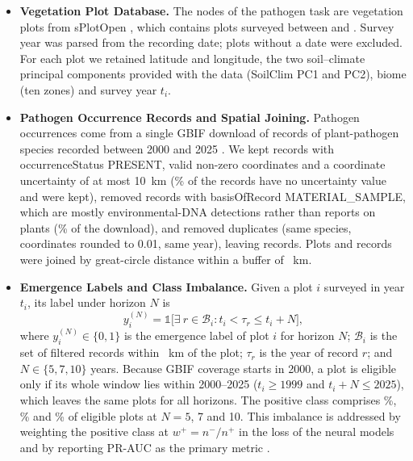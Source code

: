 \documentclass[a4paper,fleqn]{cas-sc}
\begin{document}
\begin{itemize}[leftmargin=1.4em]

\item \textbf{Vegetation Plot Database.} The nodes of the pathogen task are vegetation plots from sPlotOpen \citep{sabatini2021,splotdata}, which contains \nPlotsTotal{} plots surveyed between \surveyYearMin{} and \surveyYearMax. Survey year was parsed from the recording date; \nPlotsNoDate{} plots without a date were excluded. For each plot we retained latitude and longitude, the two soil--climate principal components provided with the data (SoilClim PC1 and PC2), biome (ten zones) and survey year $t_i$.

\item \textbf{Pathogen Occurrence Records and Spatial Joining.} Pathogen occurrences come from a single GBIF download of \gbifRecordsRaw{} records of \gbifSpecies{} plant-pathogen species recorded between 2000 and 2025 \citep{gbifdownload}. We kept records with occurrenceStatus PRESENT, valid non-zero coordinates and a coordinate uncertainty of at most 10~km (\pctUncMissing\% of the records have no uncertainty value and were kept), removed records with basisOfRecord MATERIAL\_SAMPLE, which are mostly environmental-DNA detections rather than reports on plants (\pctMaterialSample\% of the download), and removed duplicates (same species, coordinates rounded to 0.01\textdegree, same year), leaving \gbifFinal{} records. Plots and records were joined by great-circle distance within a buffer of \bufferKm~km.

\item \textbf{Emergence Labels and Class Imbalance.} Given a plot $i$ surveyed in year $t_i$, its label under horizon $N$ is
\begin{equation}
y_i^{(N)} = \mathbb{1}\Big[\exists\ r \in \mathcal{B}_i : t_i < \tau_r \leq t_i + N \Big],
\label{eq:label}
\end{equation}
where $y_i^{(N)} \in \{0,1\}$ is the emergence label of plot $i$ for horizon $N$; $\mathcal{B}_i$ is the set of filtered records within \bufferKm~km of the plot; $\tau_r$ is the year of record $r$; and $N \in \{5, 7, 10\}$ years. Because GBIF coverage starts in 2000, a plot is eligible only if its whole window lies within 2000--2025 ($t_i \geq 1999$ and $t_i + N \leq 2025$), which leaves the same \nEligible{} plots for all horizons. The positive class comprises \prevNfive\%, \prevNseven\% and \prevNonezero\% of eligible plots at $N = 5$, 7 and 10. This imbalance is addressed by weighting the positive class at $w^+ = n^-/n^+$ in the loss of the neural models and by reporting PR-AUC as the primary metric \citep{saito2015}.


\end{itemize}
\end{document}
